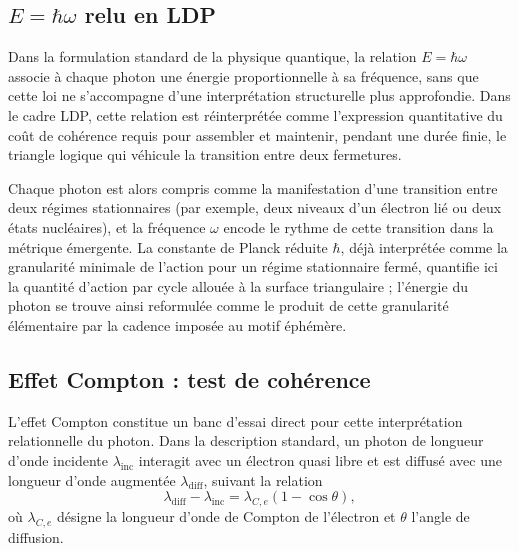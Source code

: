 \documentclass[11pt,a4paper]{article}
\begin{document}
\subsection{\texorpdfstring{\(E=\hbar\omega\)}{E = hbar omega} relu en LDP}

Dans la formulation standard de la physique quantique, la relation \(E = \hbar\omega\) associe à chaque photon une énergie proportionnelle à sa fréquence, sans que cette loi ne s’accompagne d’une interprétation structurelle plus approfondie. Dans le cadre LDP, cette relation est réinterprétée comme l’expression quantitative du coût de cohérence requis pour assembler et maintenir, pendant une durée finie, le triangle logique qui véhicule la transition entre deux fermetures.

Chaque photon est alors compris comme la manifestation d’une transition entre deux régimes stationnaires (par exemple, deux niveaux d’un électron lié ou deux états nucléaires), et la fréquence \(\omega\) encode le rythme de cette transition dans la métrique émergente. La constante de Planck réduite \(\hbar\), déjà interprétée comme la granularité minimale de l’action pour un régime stationnaire fermé, quantifie ici la quantité d’action par cycle allouée à la surface triangulaire ; l’énergie du photon se trouve ainsi reformulée comme le produit de cette granularité élémentaire par la cadence imposée au motif éphémère.

\subsection{Effet Compton : test de cohérence}

L’effet Compton constitue un banc d’essai direct pour cette interprétation relationnelle du photon. Dans la description standard, un photon de longueur d’onde incidente \(\lambda_{\mathrm{inc}}\) interagit avec un électron quasi libre et est diffusé avec une longueur d’onde augmentée \(\lambda_{\mathrm{diff}}\), suivant la relation
\[
\lambda_{\mathrm{diff}} - \lambda_{\mathrm{inc}} = \lambda_{C,e}\left(1-\cos{\theta}\right),
\]
où \(\lambda_{C,e}\) désigne la longueur d’onde de Compton de l’électron et \(\theta\) l’angle de diffusion.
\end{document}
